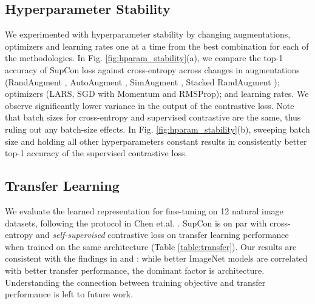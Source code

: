 \subsection{Hyperparameter Stability}
We experimented with hyperparameter stability by changing augmentations, optimizers and learning rates one at a time from the best combination for each of the methodologies. In Fig. \ref{fig:hparam_stability}(a), we compare the top-1 accuracy of SupCon loss against cross-entropy across changes in augmentations (RandAugment \cite{cubuk2019randaugment}, AutoAugment \cite{cubuk2019autoaugment}, SimAugment \cite{chen2020simple}, Stacked RandAugment \cite{tian2020makes}); optimizers (LARS, SGD with Momentum and RMSProp); and learning rates. We observe significantly lower variance in the output of the contrastive loss. Note that batch sizes for cross-entropy and supervised contrastive are the same, thus ruling out any batch-size effects. In Fig. \ref{fig:hparam_stability}(b), sweeping batch size and holding all other hyperparameters constant results in consistently better top-1 accuracy of the supervised contrastive loss.


\subsection{Transfer Learning}
We evaluate the learned representation for fine-tuning on 12 natural image datasets, following the protocol in Chen et.al. \cite{chen2020simple}. SupCon is on par with cross-entropy and \emph{self-supervised} contrastive loss on transfer learning performance when trained on the same architecture (Table \ref{table:transfer}). Our results are consistent with the findings in \cite{he2019rethinking} and \cite{kornblith2019better}: while better ImageNet models are correlated with better transfer performance, the dominant factor is architecture. Understanding the connection between training objective and transfer performance is left to future work. 

